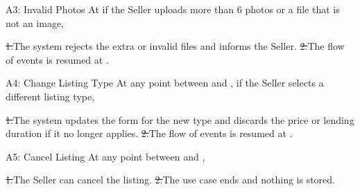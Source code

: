 \begin{flowblock}{A3: Invalid Photos}
At  if the Seller uploads more than 6 photos or a file that is not an image,\par
\st{1.}{The system rejects the extra or invalid files and informs the Seller.}
\st{2.}{The flow of events is resumed at .}
\end{flowblock}
\begin{flowblock}{A4: Change Listing Type}
At any point between  and , if the Seller selects a different listing type,\par
\st{1.}{The system updates the form for the new type and discards the price or lending duration if it no longer applies.}
\st{2.}{The flow of events is resumed at .}
\end{flowblock}
\begin{flowblock}{A5: Cancel Listing}
At any point between  and ,\par
\st{1.}{The Seller can cancel the listing.}
\st{2.}{The use case ends and nothing is stored.}
\end{flowblock}

